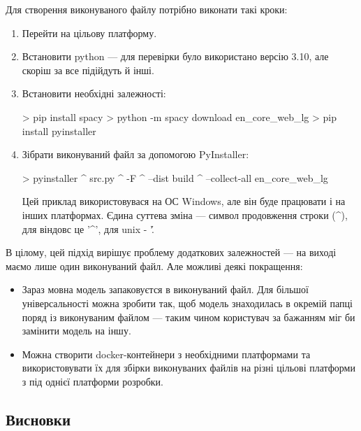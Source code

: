 \documentclass[14pt]{extarticle}
\begin{document}
  Для створення виконуваного файлу потрібно виконати такі кроки:
  \begin{enumerate}[labelindent=\dimexpr\parindent*2\relax, leftmargin=*]
    \item Перейти на цільову платформу.
    \item Встановити python --- для перевірки було використано версію 3.10,
      але скоріш за все підійдуть й інші.
    \item Встановити необхідні залежності:
      \begin{mycode}[caption={Встановлення залежностей}, label={code:install_deps}]
        > pip install spacy
        > python -m spacy download en_core_web_lg
        > pip install pyinstaller
      \end{mycode}
    \item Зібрати виконуваний файл за допомогою PyInstaller:
    \begin{mycode}[caption={Збірка виконуваного файлу}, label={code:install_deps}]
      > pyinstaller ^
          src\main.py ^
          -F ^
          --dist build ^
          --collect-all en_core_web_lg
    \end{mycode}
    Цей приклад використовувася на ОС Windows,
    але він буде працювати і на інших платформах. Єдина суттева зміна ---
    символ продовження строки (\string^), для віндовс це '\string^',
    для unix - '\string\'.
  \end{enumerate}

  В цілому, цей підхід вирішує проблему додаткових залежностей ---
  на виході маємо лише один виконуваний файл. Але можливі деякі покращення:
  \begin{itemize}[labelindent=\dimexpr{}\relax, leftmargin=*]
    \item Зараз мовна модель запаковуєтся в виконуваний файл.
      Для більшої універсальності можна зробити так,
      щоб модель знаходилась в окремій папці поряд із виконуваним файлом ---
      таким чином користувач за бажанням міг би замінити модель на іншу.
    \item Можна створити docker-контейнери з необхідними платформами
    \cite{docker_windows,docker_windows_base, docker_osx}
      та використовувати їх для збірки виконуваних файлів на
      різні цільові платформи з під однієї платформи розробки.
  \end{itemize}

  \subsection{Висновки}
\end{document}
